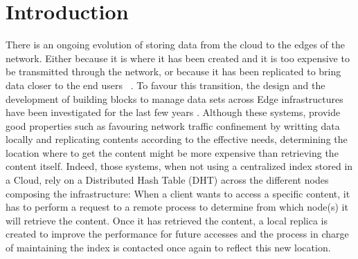 
\section{Introduction}


There is an ongoing evolution of storing data from the cloud to the
edges of the network. Either because it is where it has been created
and it is too expensive to be transmitted through the network, or
because it has been replicated to bring data closer to the end users
~\cite{shi2016edge, foggy_cache, cachier}.
%
To favour this transition, the design and the development of building
blocks to manage data sets across Edge infrastructures have been
investigated for the last few years \cite{confais2017performance,
  confais2017object, fogstore, hasenburg2020towards}.  Although these
systems, provide good properties such as favouring network traffic
confinement by writting data locally and replicating contents
according to the effective needs, determining the location where to
get the content might be more expensive than retrieving the content
itself.
%
Indeed, those systems, when not using a centralized index stored in a
Cloud, rely on a Distributed Hash Table (DHT) across the different
nodes composing the infrastructure: When a client wants to access a
specific content, it has to perform a request to a remote process to
determine from which node(s) it will retrieve the content.  Once it has
retrieved the content, a local replica
is created to improve the performance for future accesses and the
process in charge of maintaining the index is contacted once again to reflect this
new location.
%


